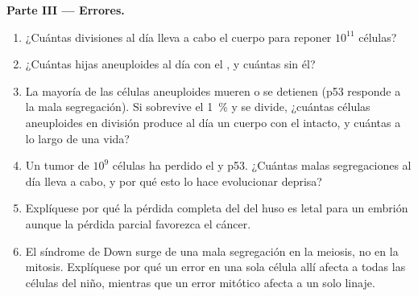 \begin{problem}
\medskip
\noindent\textbf{Parte III --- Errores.}
\begin{enumerate}[resume]
  \item ¿Cuántas divisiones al día lleva a cabo el cuerpo para reponer
        $10^{11}$ células?
  \item ¿Cuántas hijas aneuploides al día con el , y
        cuántas sin él?
  \item La mayoría de las células aneuploides mueren o se detienen (p53
        responde a la mala segregación). Si sobrevive el \qty{1}{\%} y se
        divide, ¿cuántas células aneuploides en división produce al día
        un cuerpo con el  intacto, y cuántas a lo largo
        de una vida?
  \item Un tumor de $10^{9}$ células ha perdido el  y
        p53. ¿Cuántas malas segregaciones al día lleva a cabo, y por qué
        esto lo hace evolucionar deprisa?
  \item Explíquese por qué la pérdida completa del  del
        huso es letal para un embrión aunque la pérdida parcial favorezca
        el cáncer.
  \item El síndrome de Down surge de una mala segregación en la meiosis,
        no en la mitosis. Explíquese por qué un error en una sola célula
        allí afecta a todas las células del niño, mientras que un error
        mitótico afecta a un solo linaje.
\end{enumerate}


\end{problem}
